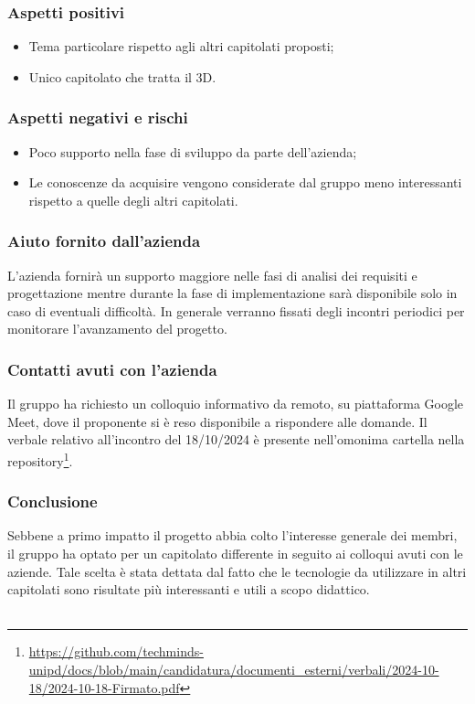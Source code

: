 \documentclass[10pt]{article}
\begin{document}
\subsubsection{Aspetti positivi}
\begin{itemize}
    \item Tema particolare rispetto agli altri capitolati proposti;
    \item Unico capitolato che tratta il 3D.
\end{itemize}
\subsubsection{Aspetti negativi e rischi}
\begin{itemize}
    \item Poco supporto nella fase di sviluppo da parte dell’azienda;
    \item Le conoscenze da acquisire vengono considerate dal gruppo meno interessanti rispetto a quelle degli altri capitolati.
\end{itemize}
\subsubsection{Aiuto fornito dall'azienda}
L'azienda fornirà un supporto maggiore nelle fasi di analisi dei requisiti e progettazione mentre durante la fase di implementazione sarà disponibile solo in caso di eventuali difficoltà. In generale verranno fissati degli incontri periodici per monitorare l'avanzamento del progetto.
\subsubsection{Contatti avuti con l'azienda}
Il gruppo ha richiesto un colloquio informativo da remoto, su piattaforma Google Meet, dove il proponente si è reso disponibile a rispondere alle domande. Il verbale relativo all'incontro del 18/10/2024 è presente nell'omonima cartella nella repository\footnote{\url{https://github.com/techminds-unipd/docs/blob/main/candidatura/documenti_esterni/verbali/2024-10-18/2024-10-18-Firmato.pdf}}.
\subsubsection{Conclusione}
Sebbene a primo impatto il progetto abbia colto l'interesse generale dei membri, il gruppo ha optato per un capitolato differente in seguito ai colloqui avuti con le aziende. Tale scelta è stata dettata dal fatto che le tecnologie da utilizzare in altri capitolati sono risultate più interessanti e utili a scopo didattico.
\\\\
\end{document}
